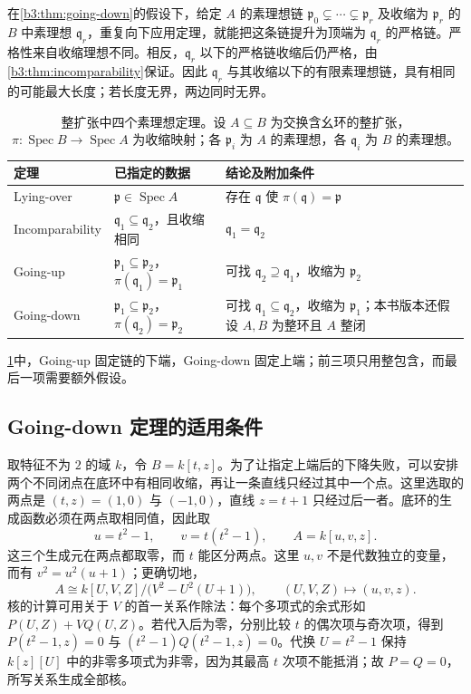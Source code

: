 在\cref{b3:thm:going-down}的假设下，给定 \(A\) 的素理想链 \(\mathfrak p_0\subsetneq\cdots\subsetneq\mathfrak p_r\) 及收缩为 \(\mathfrak p_r\) 的 \(B\) 中素理想 \(\mathfrak q_r\)，重复向下应用定理，就能把这条链提升为顶端为 \(\mathfrak q_r\) 的严格链。严格性来自收缩理想不同。相反，\(\mathfrak q_r\) 以下的严格链收缩后仍严格，由\cref{b3:thm:incomparability}保证。因此 \(\mathfrak q_r\) 与其收缩以下的有限素理想链，具有相同的可能最大长度；若长度无界，两边同时无界。

\begin{table}[H]
	\centering
	\caption[整扩张中四个素理想定理]{整扩张中四个素理想定理。设 \(A\subseteq B\) 为交换含幺环的整扩张，\(\pi:\operatorname{Spec}B\rightarrow\operatorname{Spec}A\) 为收缩映射；各 \(\mathfrak p_i\) 为 \(A\) 的素理想，各 \(\mathfrak q_i\) 为 \(B\) 的素理想。}
	\label{b3:tab:integral-prime-theorems}
	\begin{tabularx}{\textwidth}{@{}l>{\raggedright\arraybackslash}X>{\raggedright\arraybackslash}X@{}}
		\toprule
		定理 & 已指定的数据 & 结论及附加条件 \\
		\midrule
		Lying-over & \(\mathfrak p\in\operatorname{Spec}A\) & 存在 \(\mathfrak q\) 使 \(\pi(\mathfrak q)=\mathfrak p\) \\
		Incomparability & \(\mathfrak q_1\subseteq\mathfrak q_2\)，且收缩相同 & \(\mathfrak q_1=\mathfrak q_2\) \\
		Going-up & \(\mathfrak p_1\subseteq\mathfrak p_2\)，\(\pi(\mathfrak q_1)=\mathfrak p_1\) & 可找 \(\mathfrak q_2\supseteq\mathfrak q_1\)，收缩为 \(\mathfrak p_2\) \\
		Going-down & \(\mathfrak p_1\subseteq\mathfrak p_2\)，\(\pi(\mathfrak q_2)=\mathfrak p_2\) & 可找 \(\mathfrak q_1\subseteq\mathfrak q_2\)，收缩为 \(\mathfrak p_1\)；本书版本还假设 \(A,B\) 为整环且 \(A\) 整闭 \\
		\bottomrule
	\end{tabularx}
\end{table}

\cref{b3:tab:integral-prime-theorems}中，Going-up 固定链的下端，Going-down 固定上端；前三项只用整包含，而最后一项需要额外假设。

\subsection{Going-down 定理的适用条件}\label{b3:subsec:0503:03}

取特征不为 \(2\) 的域 \(k\)，令 \(B=k[t,z]\)。为了让指定上端后的下降失败，可以安排两个不同闭点在底环中有相同收缩，再让一条直线只经过其中一个点。这里选取的两点是 \((t,z)=(1,0)\) 与 \((-1,0)\)，直线 \(z=t+1\) 只经过后一者。底环的生成函数必须在两点取相同值，因此取
\[
	u=t^2-1,\qquad v=t(t^2-1),\qquad A=k[u,v,z].
\]
这三个生成元在两点都取零，而 \(t\) 能区分两点。这里 \(u,v\) 不是代数独立的变量，而有 \(v^2=u^2(u+1)\)；更确切地，
\[
	A\cong k[U,V,Z]/\bigl(V^2-U^2(U+1)\bigr), \qquad (U,V,Z)\longmapsto(u,v,z).
\]
核的计算可用关于 \(V\) 的首一关系作除法：每个多项式的余式形如 \(P(U,Z)+VQ(U,Z)\)。若代入后为零，分别比较 \(t\) 的偶次项与奇次项，得到 \(P(t^2-1,z)=0\) 与 \((t^2-1)Q(t^2-1,z)=0\)。代换 \(U=t^2-1\) 保持 \(k[z][U]\) 中的非零多项式为非零，因为其最高 \(t\) 次项不能抵消；故 \(P=Q=0\)，所写关系生成全部核。

